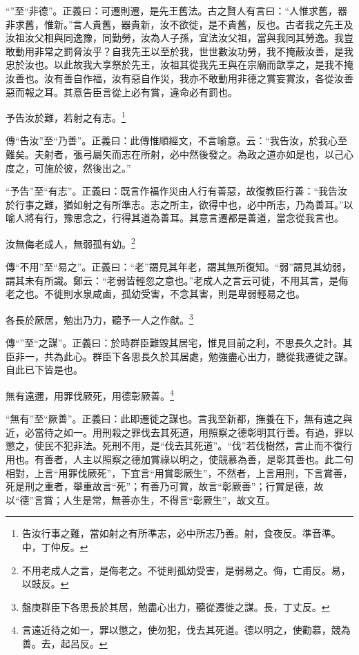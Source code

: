 {\noindent\shu{}\fzkt “”至“非德”。正義曰：可遷則遷，是先王舊法。古之賢人有言曰：“人惟求舊，器非求舊，惟新。”言人貴舊，器貴新，汝不欲徙，是不貴舊，反也。古者我之先王及汝祖汝父相與同逸豫，同勤勞，汝為人子孫，宜法汝父祖，當與我同其勞逸。我豈敢動用非常之罰脅汝乎？自我先王以至於我，世世數汝功勞，我不掩蔽汝善，是我忠於汝也。以此故我大享祭於先王，汝祖其從我先王與在宗廟而歆享之，是我不掩汝善也。汝有善自作福，汝有惡自作災，我亦不敢動用非德之賞妄賞汝，各從汝善惡而報之耳。其意告臣言從上必有賞，違命必有罰也。 \par}

予告汝於難，若射之有志。\footnote{告汝行事之難，當如射之有所準志，必中所志乃善。射，食夜反。準音準。中，丁仲反。}

{\noindent\zhuan{}\fzbyks 傳“告汝”至“乃善”。正義曰：此傳惟順經文，不言喻意。云：“我告汝，於我心至難矣。夫射者，張弓屬矢而志在所射，必中然後發之。為政之道亦如是也，以己心度之，可施於彼，然後出之。” \par}

{\noindent\shu{}\fzkt “予告”至“有志”。正義曰：既言作福作災由人行有善惡，故復教臣行善：“我告汝於行事之難，猶如射之有所準志。志之所主，欲得中也，必中所志，乃為善耳。”以喻人將有行，豫思念之，行得其道為善耳。其意言遷都是善道，當念從我言也。 \par}

汝無侮老成人，無弱孤有幼。\footnote{不用老成人之言，是侮老之。不徙則孤幼受害，是弱易之。侮，亡甫反。易，以豉反。}

{\noindent\zhuan{}\fzbyks 傳“不用”至“易之”。正義曰：“老”謂見其年老，謂其無所復知。“弱”謂見其幼弱，謂其未有所識。鄭云：“老弱皆輕忽之意也。”老成人之言云可徙，不用其言，是侮老之也。不徙則水泉咸鹵，孤幼受害，不念其害，則是卑弱輕易之也。 \par}

各長於厥居，勉出乃力，聽予一人之作猷。\footnote{盤庚群臣下各思長於其居，勉盡心出力，聽從遷徙之謀。長，丁丈反。}

{\noindent\zhuan{}\fzbyks 傳“”至“之謀”。正義曰：於時群臣難毀其居宅，惟見目前之利，不思長久之計。其臣非一，共為此心。群臣下各思長久於其居處，勉強盡心出力，聽從我遷徙之謀。自此已下皆是也。 \par}

無有遠邇，用罪伐厥死，用德彰厥善。\footnote{言遠近待之如一，罪以懲之，使勿犯，伐去其死道。德以明之，使勸慕，競為善。去，起呂反。}

{\noindent\shu{}\fzkt “無有”至“厥善”。正義曰：此即遷徙之謀也。言我至新都，撫養在下，無有遠之與近，必當待之如一。用刑殺之罪伐去其死道，用照察之德彰明其行善。有過，罪以懲之，使民不犯非法。死刑不用，是“伐去其死道”。“伐”若伐樹然，言止而不復行用也。有善者，人主以照察之德加賞祿以明之，使競慕為善，是彰其善也。此二句相對，上言“用罪伐厥死”，下宜言“用賞彰厥生”，不然者，上言用刑，下言賞善，死是刑之重者，舉重故言“死”；有善乃可賞，故言“彰厥善”；行賞是德，故以“德”言賞；人生是常，無善亦生，不得言“彰厥生”，故文互。 \par}

